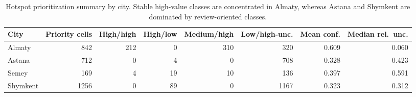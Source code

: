\begin{table}[H]
\centering
\small
\caption{Hotspot prioritization summary by city. Stable high-value classes are concentrated in Almaty, whereas Astana and Shymkent are dominated by review-oriented classes.}
\label{tab:hotspot-priority}
\begin{tabular}{lrrrrrrr}
\toprule
City & Priority cells & High/high & High/low & Medium/high & Low/high-unc. & Mean conf. & Median rel.\ unc. \\
\midrule
Almaty   & 842  & 212 & 0  & 310 & 320  & 0.609 & 0.060 \\
Astana   & 712  & 0   & 4  & 0   & 708  & 0.328 & 0.423 \\
Semey    & 169  & 4   & 19 & 10  & 136  & 0.397 & 0.591 \\
Shymkent & 1256 & 0   & 89 & 0   & 1167 & 0.323 & 0.312 \\
\bottomrule
\end{tabular}
\end{table}

